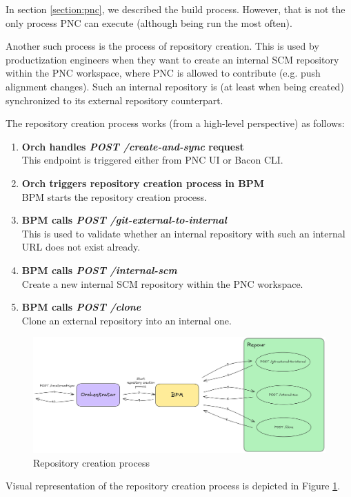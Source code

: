 \documentclass[../main.tex]{subfiles}
\begin{document}
In section \ref{section:pnc}, we described the build process. However, that is not the only process PNC can execute (although being run the most often).

Another such process is the process of repository creation. This is used by productization engineers when they want to create an internal SCM repository within the PNC workspace, where PNC is allowed to contribute (e.g. push alignment changes). Such an internal repository is (at least when being created) synchronized to its external repository counterpart.

The repository creation process works (from a high-level perspective) as follows:

\begin{enumerate}
    \item \textbf{Orch handles \textit{POST /create-and-sync} request}\\
    This endpoint is triggered either from PNC UI or Bacon CLI.

    \item \textbf{Orch triggers repository creation process in BPM}\\
    BPM starts the repository creation process.

    \item \textbf{BPM calls \textit{POST /git-external-to-internal}}\\
    This is used to validate whether an internal repository with such an internal URL does not exist already.

    \item \textbf{BPM calls \textit{POST /internal-scm}}\\
    Create a new internal SCM repository within the PNC workspace.

    \item \textbf{BPM calls \textit{\textit{POST /clone}}}\\
    Clone an external repository into an internal one.
\end{enumerate}

\begin{figure}
  \begin{center}
    \includegraphics[width=\textwidth]{images/repository-creation-process.png}
  \end{center}
  \caption{Repository creation process}
  \label{fig:repository-creation-process}
\end{figure}

Visual representation of the repository creation process is depicted in Figure \ref{fig:repository-creation-process}.
\end{document}
